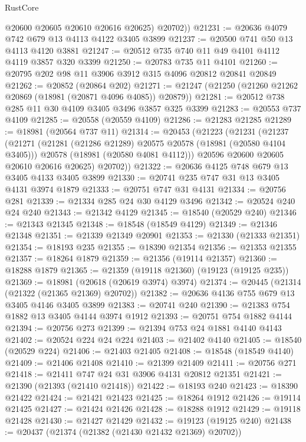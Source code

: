 \begin{lexlean}{RustCore}
\begin{coremodule}
          @20600
          @20605
          @20610
          @20616
          @20625)
        @20702))
@21231 := @20636 @4079 @742 @679 @13 @4113 @4122 @3405 @3899
@21237 := @20500 @741 @50 @13 @4113 @4120 @3881
@21247 := @20512 @735 @740 @11 @49 @4101 @4112 @4119 @3857 @320 @3399
@21250 := @20783 @735 @11 @4101
@21260 := @20795 @202 @98 @11 @3906 @3912 @315 @4096 @20812 @20841 @20849
@21262 := @20852 (@20864 @202)
@21271 := @21247 (@21250 (@21260 @21262 @20869 (@18981 (@20871 @4096 @4085)) @20879))
@21281 := @20512 @738 @285 @11 @30 @4109 @3405 @3496 @3857 @325 @3399
@21283 := @20553 @737 @4109
@21285 := @20558 (@20559 @4109)
@21286 := @21283 @21285
@21289 := @18981 (@20564 @737 @11)
@21314 := @20453
    (@21223
      (@21231
        (@21237
          (@21271
            (@21281 (@21286 @21289) @20575 @20578 (@18981 (@20580 @4104 @3405)))
            @20578
            (@18981 (@20580 @4081 @4112)))
          @20596
          @20600
          @20605
          @20610
          @20616
          @20625)
        @20702))
@21322 := @20636 @4125 @748 @679 @13 @3405 @4133 @3405 @3899
@21330 := @20741 @235 @747 @31 @13 @3405 @4131 @3974 @1879
@21333 := @20751 @747 @31 @4131
@21334 := @20756 @281
@21339 := @21334 @285 @24 @30 @4129 @3496
@21342 := @20524 @240 @24 @240
@21343 := @21342 @4129
@21345 := @18540 (@20529 @240)
@21346 := @21343 @21345
@21348 := @18548 (@18549 @4129)
@21349 := @21346 @21348
@21351 := @21339 @21349 @20901
@21353 := @21330 (@21333 @21351)
@21354 := @18193 @235
@21355 := @18390 @21354
@21356 := @21353 @21355
@21357 := @18264 @1879
@21359 := @21356 (@19114 @21357)
@21360 := @18288 @1879
@21365 := @21359 (@19118 @21360) (@19123 (@19125 @235))
@21369 := @18981 (@20618 (@20619 @3974) @3974)
@21374 := @20445 (@21314 (@21322 (@21365 @21369) @20702))
@21382 := @20636 @4136 @755 @679 @13 @3405 @4146 @3405 @3899
@21383 := @20741 @240
@21390 := @21383 @754 @1882 @13 @3405 @4144 @3974 @1912
@21393 := @20751 @754 @1882 @4144
@21394 := @20756 @273
@21399 := @21394 @753 @24 @1881 @4140 @4143
@21402 := @20524 @224 @24 @224
@21403 := @21402 @4140
@21405 := @18540 (@20529 @224)
@21406 := @21403 @21405
@21408 := @18548 (@18549 @4140)
@21409 := @21406 @21408
@21410 := @21399 @21409
@21411 := @20756 @271
@21418 := @21411 @747 @24 @31 @3906 @4131 @20812 @21351
@21421 := @21390 (@21393 (@21410 @21418))
@21422 := @18193 @240
@21423 := @18390 @21422
@21424 := @21421 @21423
@21425 := @18264 @1912
@21426 := @19114 @21425
@21427 := @21424 @21426
@21428 := @18288 @1912
@21429 := @19118 @21428
@21430 := @21427 @21429
@21432 := @19123 (@19125 @240)
@21438 := @20437 (@21374 (@21382 (@21430 @21432 @21369) @20702))

\end{coremodule}
\end{lexlean}
